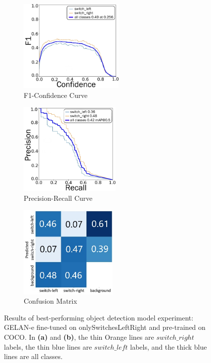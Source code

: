 \begin{figure}[H]
    \centering
    \begin{subfigure}{0.32\textwidth}
        \centering
        \includegraphics[width=\linewidth,height=4.5cm,keepaspectratio]{PICs/experiments/objectdetectionExperiment/F1_curve_updated_v2.jpg}
        \caption{F1-Confidence Curve}
        \label{fig:objectDetectionResultsMetrics_a}
    \end{subfigure}
    \begin{subfigure}{0.32\textwidth}
        \centering
        \includegraphics[width=\linewidth,height=4.5cm,keepaspectratio]{PICs/experiments/objectdetectionExperiment/PR_curve_updated_v2.jpg}
        \caption{Precision-Recall Curve}
        \label{fig:objectDetectionResultsMetrics_b}
    \end{subfigure}
    \begin{subfigure}{0.32\textwidth}
        \centering
        \includegraphics[width=\linewidth,height=4.5cm,keepaspectratio]{PICs/experiments/objectdetectionExperiment/confusion_matrix_updated_v2.jpg}
        \caption{Confusion Matrix}
        \label{fig:objectDetectionResultsMetrics_c}
    \end{subfigure}
    \caption{Results of best-performing object detection model experiment: \ac{GELAN}-e fine-tuned on onlySwitchesLeftRight and pre-trained on COCO.
    In \textbf{(a)} and \textbf{(b)}, the thin Orange lines are $switch\_right$ labels, the thin blue lines are $switch\_left$ labels, and the thick blue lines are all classes.}
    \label{fig:objectDetectionResultsMetrics}
\end{figure}

